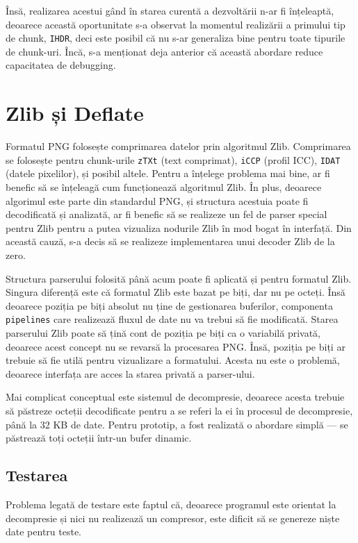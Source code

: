 \documentclass[a4paper,12pt]{report}
\begin{document}
Însă, realizarea acestui gând în starea curentă a dezvoltării n-ar fi înțeleaptă,
deoarece această oportunitate s-a observat la momentul
realizării a primului tip de chunk, \texttt{IHDR},
deci este posibil că nu s-ar generaliza bine pentru toate tipurile de chunk-uri.
Încă, s-a menționat deja anterior că această abordare reduce capacitatea de debugging.

\section{Zlib și Deflate}

Formatul \ac{PNG} folosește comprimarea datelor prin algoritmul Zlib.
Comprimarea se folosește pentru chunk-urile \texttt{zTXt} (text comprimat),
\texttt{iCCP} (profil \ac{ICC}), \texttt{IDAT} (datele pixelilor),
și posibil altele.
Pentru a înțelege problema mai bine, ar fi benefic să se înțeleagă cum funcționează algoritmul Zlib.
În plus, deoarece algorimul este parte din standardul \ac{PNG},
și structura acestuia poate fi decodificată și analizată,
ar fi benefic să se realizeze un fel de parser special pentru Zlib pentru a putea vizualiza nodurile Zlib
în mod bogat în interfață.
Din această cauză, s-a decis să se realizeze implementarea unui decoder Zlib de la zero.

Structura parserului folosită până acum poate fi aplicată și pentru formatul Zlib.
Singura diferență este că formatul Zlib este bazat pe biți, dar nu pe octeți.
Însă deoarece poziția pe biți absolut nu ține de gestionarea buferilor,
componenta \texttt{pipelines} care realizează fluxul de date nu va trebui să fie modificată.
Starea parserului Zlib poate să țină cont de poziția pe biți ca o variabilă privată, deoarece
acest concept nu se revarsă la procesarea \ac{PNG}.
Însă, poziția pe biți ar trebuie să fie utilă pentru vizualizare a formatului.
Acesta nu este o problemă, deoarece interfața are acces la starea privată a parser-ului.

Mai complicat conceptual este sistemul de decompresie,
deoarece acesta trebuie să păstreze octeții decodificate pentru a se referi la ei
în procesul de decompresie, până la 32 KB de date.
Pentru prototip, a fost realizată o abordare simplă --- se păstrează toți octeții într-un bufer dinamic.

\subsection{Testarea}

Problema legată de testare este faptul că, deoarece programul este orientat
la decompresie și nici nu realizează un compresor,
este dificit să se genereze niște date pentru teste.
\end{document}
